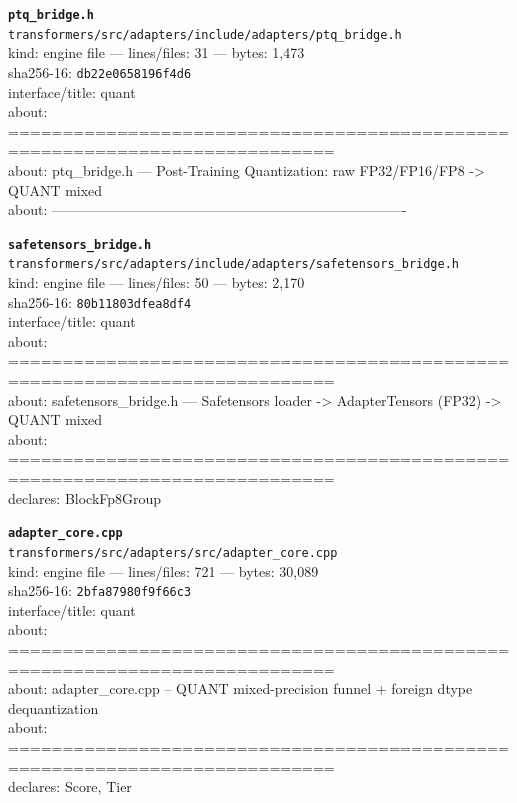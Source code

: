 \noindent\textbf{\texttt{ptq\_bridge.h}}\\
\texttt{transformers/src/adapters/include/adapters/ptq\_bridge.h}\\
kind: engine file --- lines/files: 31 --- bytes: 1,473\\
sha256-16: \texttt{db22e0658196f4d6}\\
interface/title: quant\\
about: ============================================================================\\
about: ptq\_bridge.h — Post-Training Quantization: raw FP32/FP16/FP8 -> QUANT mixed\\
about: ----------------------------------------------------------------------------\\
\vspace*{6.0pt}

\noindent\textbf{\texttt{safetensors\_bridge.h}}\\
\texttt{transformers/src/adapters/include/adapters/safetensors\_bridge.h}\\
kind: engine file --- lines/files: 50 --- bytes: 2,170\\
sha256-16: \texttt{80b11803dfea8df4}\\
interface/title: quant\\
about: ============================================================================\\
about: safetensors\_bridge.h — Safetensors loader -> AdapterTensors (FP32) -> QUANT mixed\\
about: ============================================================================\\
declares: BlockFp8Group\\
\vspace*{6.0pt}

\noindent\textbf{\texttt{adapter\_core.cpp}}\\
\texttt{transformers/src/adapters/src/adapter\_core.cpp}\\
kind: engine file --- lines/files: 721 --- bytes: 30,089\\
sha256-16: \texttt{2bfa87980f9f66c3}\\
interface/title: quant\\
about: ============================================================================\\
about: adapter\_core.cpp -- QUANT mixed-precision funnel + foreign dtype dequantization\\
about: ============================================================================\\
declares: Score, Tier\\
\vspace*{6.0pt}


